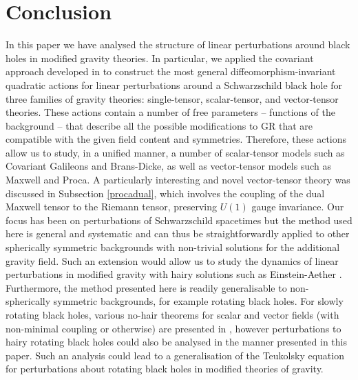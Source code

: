 \documentclass[10pt,twocolumn,preprintnumbers,amsmath,amssymb,nofootinbib
,superscriptaddress]{revtex4-1}
\begin{document}
{{{\section{Conclusion}\label{conclusion}
In this paper we have analysed the structure of linear perturbations around black holes in modified gravity theories. In particular, we applied the covariant approach developed in \cite{Tattersall:2017eav} to construct the most general diffeomorphism-invariant quadratic actions for linear perturbations around a Schwarzschild black hole for three families of gravity theories: single-tensor, scalar-tensor, and vector-tensor theories. These actions contain a number of free parameters -- functions of the background -- that describe all the possible modifications to GR that are compatible with the given field content and symmetries. Therefore, these actions allow us to study, in a unified manner, a number of scalar-tensor models such as Covariant Galileons and Brans-Dicke, as well as vector-tensor models such as Maxwell and Proca. A particularly interesting and novel vector-tensor theory was discussed in Subsection \ref{procadual}, which involves the coupling of the dual Maxwell tensor to the Riemann tensor, preserving $U(1)$ gauge invariance. Our focus has been on perturbations of Schwarzschild spacetimes but the method used here is general and systematic and can thus be straightforwardly applied to other spherically symmetric backgrounds with non-trivial solutions for the additional gravity field. Such an extension would allow us to study the dynamics of linear perturbations in modified gravity with hairy solutions such as Einstein-Aether \cite{Eling:2006ec}. Furthermore, the method presented here is readily generalisable to non-spherically symmetric backgrounds, for example rotating black holes. For slowly rotating black holes, various no-hair theorems for scalar and vector fields (with non-minimal coupling or otherwise) are presented in \cite{Sotiriou:2013qea,PhysRevD.5.2403}, however perturbations to hairy rotating black holes could also be analysed in the manner presented in this paper. Such an analysis could lead to a generalisation of the Teukolsky equation \cite{Teukolsky:2014vca} for perturbations about rotating black holes in modified theories of gravity.

}}}
\end{document}
